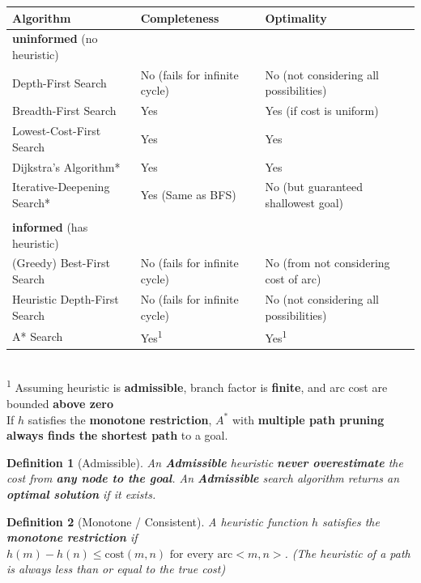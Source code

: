 \documentclass{article}
\theoremstyle{note}
\newtheorem{definition}{Definition}[section]
\begin{document}
\begin{table}[h!]
\begin{tabular}{@{}lll@{}}
\toprule
\textbf{Algorithm} & \textbf{Completeness} & \textbf{Optimality} \\ \midrule
\textbf{uninformed} (no heuristic)\\
Depth-First Search & No (fails for infinite cycle) & No (not considering all possibilities) \\
Breadth-First Search & Yes & Yes (if cost is uniform)\\
Lowest-Cost-First Search & Yes & Yes\\
Dijkstra's Algorithm* & Yes & Yes \\
Iterative-Deepening Search* & Yes (Same as BFS) & No (but guaranteed shallowest goal) \\\\

\textbf{informed} (has heuristic)\\
(Greedy) Best-First Search & No (fails for infinite cycle) & No (from not considering cost of arc)\\
Heuristic Depth-First Search & No (fails for infinite cycle) & No (not considering all possibilities)\\
A* Search & Yes\textsuperscript{1}  & Yes\textsuperscript{1} \\ \bottomrule
\end{tabular}\\
\footnotesize{\textsuperscript{1} Assuming heuristic is \textbf{admissible}, branch factor is \textbf{finite}, and arc cost are bounded \textbf{above zero}} \\
\footnotesize{If \(h\) satisfies the \textbf{monotone restriction}, $A^*$ with \textbf{multiple path pruning} \textbf{always finds the shortest path} to a goal}.

\end{table}



\begin{definition}[Admissible]
An \textbf{Admissible} heuristic \textbf{never overestimate} the cost from \textbf{any node to the goal}. An \textbf{Admissible} search algorithm returns an \textbf{optimal solution} if it exists.
\end{definition}

\begin{definition}[Monotone / Consistent]
A heuristic function \(h\) satisfies the \textbf{monotone restriction} if \textbf{$h(m) - h(n) \le \text{cost}(m,n) \text{ for every arc} <m,n>$}. (The heuristic of a path is always less than or equal to the true cost)
\end{definition}
\end{document}
